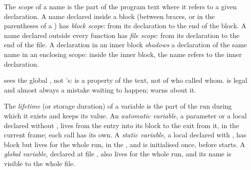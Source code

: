 \begin{definition}\label{def:b1:c-functions-and-stack:scope}
The \emph{scope} of a name is the part of the program text where it refers to a given declaration. A
name declared inside a block (between braces, or in the parentheses of a ) has \emph{block scope}: from
its declaration to the end of the block. A name declared outside every function has \emph{file scope}: from its
declaration to the end of the file. A declaration in an inner block \emph{shadows} a declaration of
the same name in an enclosing scope: inside the inner block, the name refers to the inner declaration.
\end{definition}

\label{lst:b1:c-functions-and-stack:shadow}


 sees the global , not 's:  is a property of the text, not of who called
whom.  is legal and almost always a mistake waiting to happen;  warns about it.

\begin{definition}\label{def:b1:c-functions-and-stack:lifetime}
The \emph{lifetime} (or storage duration) of a variable is the part of the run
during which it exists and keeps its value. An \emph{automatic variable}, a parameter or a
local declared without , lives from the entry into its block to the exit from it, in the current
frame; each call has its own. A \emph{static variable}, a local declared with
, has block  but lives for the whole run, in the , and is initialised once, before
 starts. A \emph{global variable}, declared at file , also lives for the
whole run, and its name is visible to the whole file.
\end{definition}

\label{lst:b1:c-functions-and-stack:counter}

